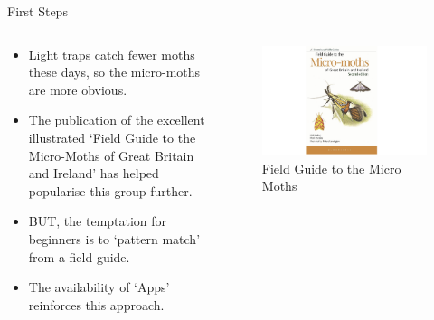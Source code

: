 \documentclass[
  ignorenonframetext,
]{beamer}
\providecommand{\tightlist}{%
  \setlength{\itemsep}{0pt}\setlength{\parskip}{0pt}}
\begin{document}
\begin{frame}{First Steps}
\protect\hypertarget{first-steps-1}{}
\begin{columns}[T]
\begin{column}{0.5\textwidth}
\begin{itemize}
\tightlist
\item
  Light traps catch fewer moths these days, so the micro-moths are more
  obvious.
\item
  The publication of the excellent illustrated `Field Guide to the
  Micro-Moths of Great Britain and Ireland' has helped popularise this
  group further.
\item
  BUT, the temptation for beginners is to `pattern match' from a field
  guide.
\item
  The availability of `Apps' reinforces this approach.
\end{itemize}
\end{column}

\begin{column}{0.5\textwidth}
\begin{figure}
\centering
\includegraphics{./images/micro-field-guide.jpg}
\caption{Field Guide to the Micro Moths}
\end{figure}
\end{column}
\end{columns}
\end{frame}
\end{document}
